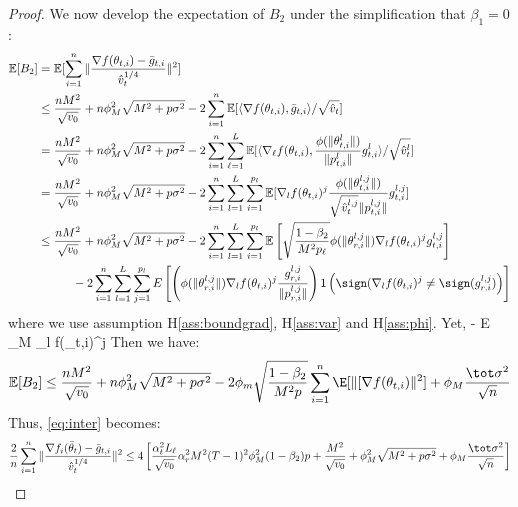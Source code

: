 \documentclass[11pt]{article}
\begin{document}
\begin{proof}
We now develop the expectation of $B_2$ under the simplification that $\beta_1 = 0$:
\begin{align}\notag
    \mathbb E[B_2]&=\mathbb E[\sum_{i=1}^n\Vert \frac{\nabla f(\theta_{t,i})-\bar g_{t,i}}{\hat v_t^{1/4}} \Vert^2] \\\notag
    &\leq \frac{nM^2}{\sqrt{v_0}}+n\phi_M^2\sqrt{M^2+p\sigma^2}-2\sum_{i=1}^n\mathbb E[\langle \nabla f(\theta_{t,i}),\bar g_{t,i} \rangle/\sqrt{\hat v_t}]\\\notag
    &=\frac{nM^2}{\sqrt{v_0}}+n\phi_M^2\sqrt{M^2+p\sigma^2}-2\sum_{i=1}^n \sum_{\ell=1}^L \mathbb E[\langle \nabla_\ell f(\theta_{t,i}),\frac{\phi(\|\theta_{t,i}^l \|)}{\| p_{t,i}^l \|}g_{t,i}^l \rangle/\sqrt{\hat v_t^l}]\\\notag
    &=\frac{nM^2}{\sqrt{v_0}}+n\phi_M^2\sqrt{M^2+p\sigma^2}-2\sum_{i=1}^n \sum_{l=1}^L\sum_{i=1}^{p_l} \mathbb E[\nabla_l f(\theta_{t,i})^j\frac{\phi(\|\theta_{t,i}^{l,j} \|)}{\sqrt{\hat v_t^{l,j}}\| p_{t,i}^{l,j} \|}g_{t,i}^{l,j} ]\\\notag
    & \leq \frac{nM^2}{\sqrt{v_0}}+n\phi_M^2\sqrt{M^2+p\sigma^2}-2\sum_{i=1}^n \sum_{l=1}^L\sum_{i=1}^{p_l} \mathbb E \left[ \sqrt{\frac{1-\beta_2}{M^2 p_\ell}}  \phi(\|\theta_{r,i}^{l,j}\|)  \nabla_l f(\theta_{t,i})^j  g_{t,i}^{l,j}\right]\\\notag
    &\hspace{0.4in} -2 \sum_{i = 1}^n \sum_{l=1}^L\sum_{j=1}^{p_l}  E \left[  \left( \phi(\|\theta_{r,i}^{l,j}\|)   \nabla_l f(\theta_{t,i})^j   \frac{g_{r,i}^{l,j}}{ \|p_{r,i}^{l,j}\|}\right)\mathsf{1}\left( \sign(  \nabla_l f(\theta_{t,i})^j \neq  \sign( g_{r,i}^{l,j}) \right)\right]
\end{align}
where we use assumption H\ref{ass:boundgrad}, H\ref{ass:var} and H\ref{ass:phi}. 
Yet,
\beq\notag
- \mathbb E  \leq  \phi_M \nabla_l f(\theta_{t,i})^j   
\eeq
Then we have:
\begin{align}\notag
    \mathbb E[B_2]\leq  \frac{nM^2}{\sqrt{v_0}}+n\phi_M^2\sqrt{M^2+p\sigma^2}-2 \phi_m \sqrt{\frac{1-\beta_2}{M^2 p}} \sum_{i=1}^n \E[\| [\nabla f(\theta_{t,i}) \|^2] + \phi_M \frac{\tot \sigma^2}{\sqrt{n}}
\end{align}
Thus, \eqref{eq:inter} becomes:
\begin{align}\notag
    \frac{2}{n}\sum_{i=1}^n\Vert \frac{\nabla f_i(\bar\theta_t)-\bar g_{t,i}}{\hat v_t^{1/4}} \Vert^2 \leq 4 \left[ \frac{\alpha_t^2 L_\ell}{\sqrt{v_0}} \alpha_r^2 M^2 (T-1)^2 \phi_M^2 (1-\beta_2)p + \frac{M^2}{\sqrt{v_0}}+\phi_M^2\sqrt{M^2+p\sigma^2} + \phi_M \frac{\tot \sigma^2}{\sqrt{n}}\right]
\end{align}


\end{proof}
\end{document}
